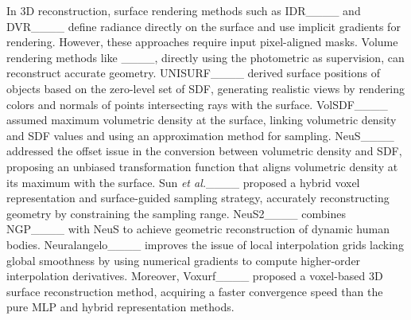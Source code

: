 In 3D reconstruction, surface rendering methods such as IDR____ and DVR____ define radiance directly on the surface and use implicit gradients for rendering. However, these approaches require input pixel-aligned masks. Volume rendering methods like ____, directly using the photometric as supervision, can reconstruct accurate geometry. UNISURF____ derived surface positions of objects based on the zero-level set of SDF, generating realistic views by rendering colors and normals of points intersecting rays with the surface. VolSDF____ assumed maximum volumetric density at the surface, linking volumetric density and SDF values and using an approximation method for sampling. NeuS____ addressed the offset issue in the conversion between volumetric density and SDF, proposing an unbiased transformation function that aligns volumetric density at its maximum with the surface. Sun \textit{et al.}____ proposed a hybrid voxel representation and surface-guided sampling strategy, accurately reconstructing geometry by constraining the sampling range. NeuS2____ combines NGP____ with NeuS to achieve geometric reconstruction of dynamic human bodies. Neuralangelo____ improves the issue of local interpolation grids lacking global smoothness by using numerical gradients to compute higher-order interpolation derivatives. Moreover, Voxurf____ proposed a voxel-based 3D surface reconstruction method, acquiring a faster convergence speed than the pure MLP and hybrid representation methods.

